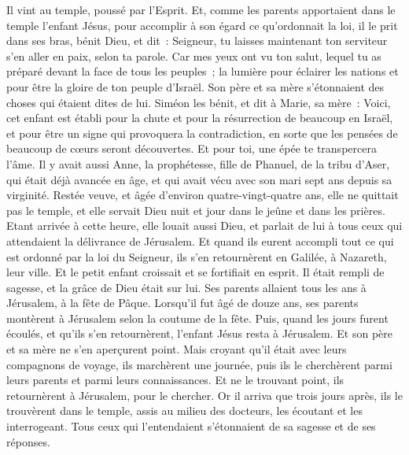 \begin{multicols}{2}
Il vint au temple, poussé par l'Esprit. Et, comme les parents apportaient dans le temple l'enfant Jésus, pour accomplir à son égard ce qu'ordonnait la loi,
il le prit dans ses bras, bénit Dieu, et dit~:
Seigneur, tu laisses maintenant ton serviteur s'en aller en paix, selon ta parole.
Car mes yeux ont vu ton salut,
lequel tu as préparé devant la face de tous les peuples~;
la lumière pour éclairer les nations et pour être la gloire de ton peuple d'Israël.
Son père et sa mère s'étonnaient des choses qui étaient dites de lui.
Siméon les bénit, et dit à Marie, sa mère~: Voici, cet enfant est établi pour la chute et pour la résurrection de beaucoup en Israël, et pour être un signe qui provoquera la contradiction,
en sorte que les pensées de beaucoup de cœurs seront découvertes. Et pour toi, une épée te transpercera l'âme.
Il y avait aussi Anne, la prophétesse, fille de Phanuel, de la tribu d'Aser, qui était déjà avancée en âge, et qui avait vécu avec son mari sept ans depuis sa virginité.
Restée veuve, et âgée d'environ quatre-vingt-quatre ans, elle ne quittait pas le temple, et elle servait Dieu nuit et jour dans le jeûne et dans les prières.
Etant arrivée à cette heure, elle louait aussi Dieu, et parlait de lui à tous ceux qui attendaient la délivrance de Jérusalem.
Et quand ils eurent accompli tout ce qui est ordonné par la loi du Seigneur, ils s'en retournèrent en Galilée, à Nazareth, leur ville.
Et le petit enfant croissait et se fortifiait en esprit. Il était rempli de sagesse, et la grâce de Dieu était sur lui.
Ses parents allaient tous les ans à Jérusalem, à la fête de Pâque.
Lorsqu'il fut âgé de douze ans, ses parents montèrent à Jérusalem selon la coutume de la fête.
Puis, quand les jours furent écoulés, et qu'ils s'en retournèrent, l'enfant Jésus resta à Jérusalem. Et son père et sa mère ne s'en aperçurent point.
Mais croyant qu'il était avec leurs compagnons de voyage, ils marchèrent une journée, puis ils le cherchèrent parmi leurs parents et parmi leurs connaissances.
Et ne le trouvant point, ils retournèrent à Jérusalem, pour le chercher.
Or il arriva que trois jours après, ils le trouvèrent dans le temple, assis au milieu des docteurs, les écoutant et les interrogeant.
Tous ceux qui l'entendaient s'étonnaient de sa sagesse et de ses réponses.

\end{multicols}
